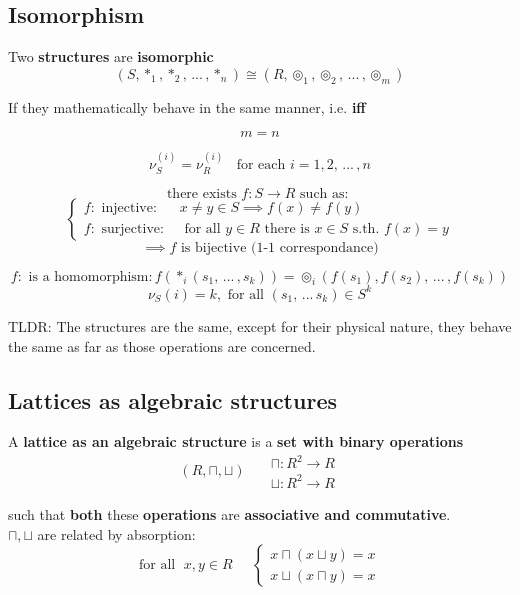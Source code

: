 	\newpage

	\subsection{Isomorphism}
	Two \textbf{structures} are \textbf{isomorphic}
	$$(S, \ast_1, \ast_2, \, ... \, , \ast_n) \cong (R, \circledcirc_1, \circledcirc_2, \, ... \, , \circledcirc_m) $$

	If they mathematically behave in the same manner, i.e. \textbf{iff}

	$$ m = n $$

	$$ \nu_S^{(i)} = \nu_R^{(i)} \;\; \text{ for each } i = 1,2, \, ... \, , n $$

	$$ \text{there exists } f : S \rightarrow R \text{ such as: } $$
	$$\begin{cases}
		f : \text{ injective: } & x \neq y \in S \implies f(x) \neq f(y) \\
		f: \text{ surjective: }  & \text{ for all } y \in R \text{ there is } x \in S \text{ s.th. } f(x) = y
	\end{cases}$$
	$$\implies f \text{ is bijective (1-1 correspondance)} $$

	$$ f: \text{ is a homomorphism}: f(\ast_i (s_1, \, ... \, , s_k)) = \circledcirc_i(f(s_1), f(s_2), \, ... \, , f(s_k))$$
	$$ \nu_S (i) = k, \text{ for all } (s_1, \, ... \, s_k) \in S^k $$

	TLDR: The structures are the same, except for their physical nature, they behave the same as far as those operations are concerned.\\

	\newpage

	\subsection{Lattices as algebraic structures}

	A \textbf{lattice as an algebraic structure} is a \textbf{set with binary operations}
	$$ (R, \sqcap, \sqcup) \;\;\;\;\;
	\begin{array}{c}
		\sqcap: R^2 \rightarrow R\\
		\sqcup: R^2 \rightarrow R
	\end{array}
	 $$

	such that \textbf{both} these \textbf{operations} are \textbf{associative and commutative}.\\

	$\sqcap, \sqcup$ are related by absorption:
	$$
	\text{for all }\; x, y \in R \;\;\;\;\;
	\begin{cases}
		x \sqcap (x \sqcup y) = x \\
		x \sqcup (x \sqcap y) = x
	\end{cases}$$

